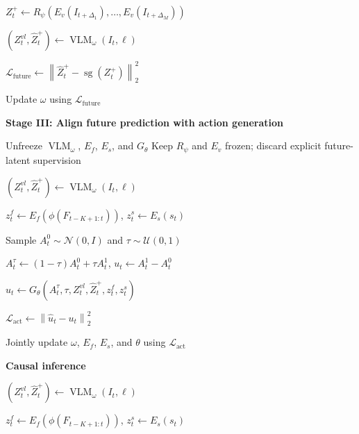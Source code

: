 {\begin{algorithm}[t]
\begin{algorithmic}[1]
    \State $Z_t^{+}
    \gets
    R_{\psi}\!\left(
    E_v(I_{t+\Delta_1}),\ldots,E_v(I_{t+\Delta_M})
    \right)$

    \State $(Z_t^{vl},\widehat{Z}_t^{+})
    \gets
    \operatorname{VLM}_{\omega}(I_t,\ell)$

    \State $\mathcal{L}_{\mathrm{future}}
    \gets
    \left\|
    \widehat{Z}_t^{+}
    -
    \operatorname{sg}(Z_t^{+})
    \right\|_2^2$

    \State Update $\omega$
    using $\mathcal{L}_{\mathrm{future}}$

\EndFor

\Statex
\Statex \textbf{Stage III: Align future prediction with action generation}

\State Unfreeze $\operatorname{VLM}_{\omega}$,
$E_f$, $E_s$, and $G_{\theta}$
\State Keep $R_{\psi}$ and $E_v$ frozen;
discard explicit future-latent supervision


    \State $(Z_t^{vl},\widehat{Z}_t^{+})
    \gets
    \operatorname{VLM}_{\omega}(I_t,\ell)$

    \State $z_t^f
    \gets
    E_f\!\left(\phi(F_{t-K+1:t})\right)$,
    \quad
    $z_t^s \gets E_s(s_t)$

    \State Sample $A_t^0 \sim \mathcal{N}(0,I)$
    and $\tau \sim \mathcal{U}(0,1)$

    \State $A_t^\tau
    \gets
    (1-\tau)A_t^0+\tau A_t^1$,
    \quad
    $u_t \gets A_t^1-A_t^0$

    \State $\widehat{u}_t
    \gets
    G_{\theta}\!\left(
    A_t^\tau,\tau,
    Z_t^{vl},\widehat{Z}_t^{+},z_t^f,z_t^s
    \right)$

    \State $\mathcal{L}_{\mathrm{act}}
    \gets
    \left\|
    \widehat{u}_t-u_t
    \right\|_2^2$

    \State Jointly update $\omega$, $E_f$, $E_s$, and $\theta$
    using $\mathcal{L}_{\mathrm{act}}$

\EndFor

\Statex
\Statex \textbf{Causal inference}


    \State $(Z_t^{vl},\widehat{Z}_t^{+})
    \gets
    \operatorname{VLM}_{\omega}(I_t,\ell)$

    \State $z_t^f
    \gets
    E_f\!\left(\phi(F_{t-K+1:t})\right)$,
    \quad
    $z_t^s \gets E_s(s_t)$


\end{algorithmic}
\end{algorithm}}
